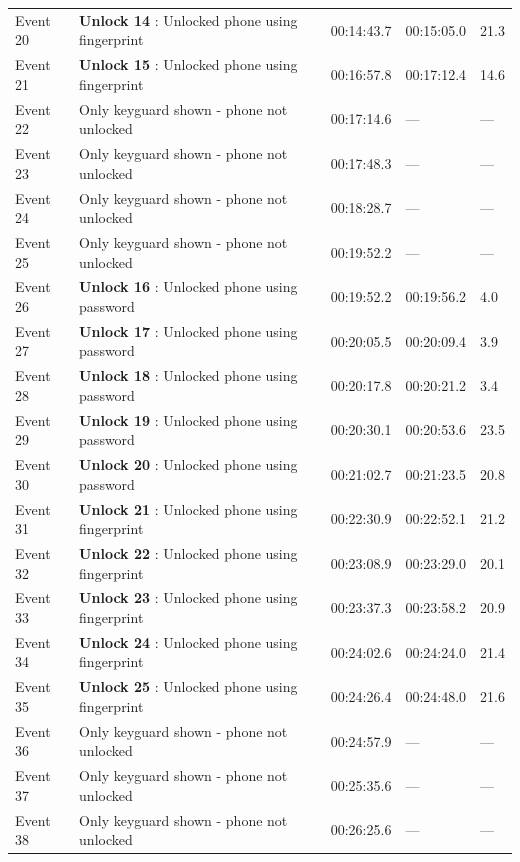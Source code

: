 \documentclass{article}
\begin{document}
\begin{enumerate}
\begin{longtable}{p{1.6cm} p{6.4cm} p{3.0cm} p{2.6cm} p{2.2cm}}
        Event 20 & \textbf{Unlock 14} : Unlocked phone using fingerprint & 00:14:43.7 & 00:15:05.0 & 21.3 \\
        Event 21 & \textbf{Unlock 15} : Unlocked phone using fingerprint & 00:16:57.8 & 00:17:12.4 & 14.6 \\
        Event 22 & Only keyguard shown - phone not unlocked & 00:17:14.6 & --- & --- \\
        Event 23 & Only keyguard shown - phone not unlocked & 00:17:48.3 & --- & --- \\
        Event 24 & Only keyguard shown - phone not unlocked & 00:18:28.7 & --- & --- \\
        Event 25 & Only keyguard shown - phone not unlocked & 00:19:52.2 & --- & --- \\
        Event 26 & \textbf{Unlock 16} : Unlocked phone using password & 00:19:52.2 & 00:19:56.2 & 4.0 \\
        Event 27 & \textbf{Unlock 17} : Unlocked phone using password & 00:20:05.5 & 00:20:09.4 & 3.9 \\
        Event 28 & \textbf{Unlock 18} : Unlocked phone using password & 00:20:17.8 & 00:20:21.2 & 3.4 \\
        Event 29 & \textbf{Unlock 19} : Unlocked phone using password & 00:20:30.1 & 00:20:53.6 & 23.5 \\
        Event 30 & \textbf{Unlock 20} : Unlocked phone using password & 00:21:02.7 & 00:21:23.5 & 20.8 \\
        Event 31 & \textbf{Unlock 21} : Unlocked phone using fingerprint & 00:22:30.9 & 00:22:52.1 & 21.2 \\
        Event 32 & \textbf{Unlock 22} : Unlocked phone using fingerprint & 00:23:08.9 & 00:23:29.0 & 20.1 \\
        Event 33 & \textbf{Unlock 23} : Unlocked phone using fingerprint & 00:23:37.3 & 00:23:58.2 & 20.9 \\
        Event 34 & \textbf{Unlock 24} : Unlocked phone using fingerprint & 00:24:02.6 & 00:24:24.0 & 21.4 \\
        Event 35 & \textbf{Unlock 25} : Unlocked phone using fingerprint & 00:24:26.4 & 00:24:48.0 & 21.6 \\
        Event 36 & Only keyguard shown - phone not unlocked & 00:24:57.9 & --- & --- \\
        Event 37 & Only keyguard shown - phone not unlocked & 00:25:35.6 & --- & --- \\
        Event 38 & Only keyguard shown - phone not unlocked & 00:26:25.6 & --- & --- \\

\end{longtable}
\end{enumerate}
\end{document}

